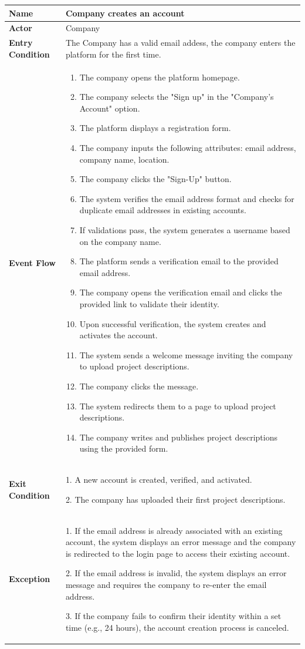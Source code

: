 \begin{longtable}{|p{}|p{}|}
\hline
\textbf{Name} & Company creates an account \\
\hline
\textbf{Actor} & Company\\
\hline
\textbf{Entry Condition} & The Company has a valid email addess, the company enters the platform for the first time. \\
\hline
\textbf{Event Flow} & 
\begin{enumerate}
    \item The company opens the platform homepage.
    \item The company selects the "Sign up" in the "Company's Account" option.
    \item The platform displays a registration form.
    \item The company inputs the following attributes: email address, company name, location.
    \item The company clicks the "Sign-Up" button.
    \item The system verifies the email address format and checks for duplicate email addresses in existing accounts.
    \item If validations pass, the system generates a username based on the company name.	
    \item The platform sends a verification email to the provided email address.
    \item The company opens the verification email and clicks the provided link to validate their identity.
    \item Upon successful verification, the system creates and activates the account.
    \item The system sends a welcome message inviting the company to upload project descriptions.
    \item  The company clicks the message.
    \item The system redirects them to a page to upload project descriptions.
    \item  The company writes and publishes project descriptions using the provided form.
\end{enumerate} \\
\hline
\textbf{Exit Condition} & 
1. A new account is created, verified, and activated.

2. The company has uploaded their first project descriptions.\\
\hline
\textbf{Exception} & 
1. If the email address is already associated with an existing account, the system displays an error message and the company is redirected to the login page to access their existing account.	

2. If the email address is invalid, the system displays an error message and requires the company to re-enter the email address.	

3. If the company fails to confirm their identity within a set time (e.g., 24 hours), the account creation process is canceled.\\
\hline
\end{longtable}

